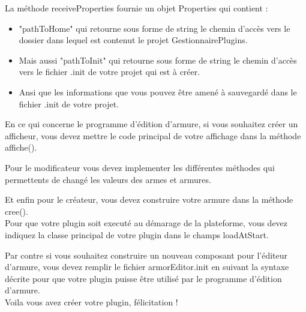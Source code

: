 La méthode receiveProperties fournie un objet Properties qui contient : 
\begin{itemize}
    \item "pathToHome" qui retourne sous forme de string le chemin d'accès vers le dossier dans lequel est contenut le projet GestionnairePlugins.
    \item Mais aussi "pathToInit" qui retourne sous forme de string le chemin d'accès vers le fichier .init de votre projet qui est à créer.
    \item Ansi que les informations que vous pouvez être amené à sauvegardé dans le fichier .init de votre projet.\\
\end{itemize}

En ce qui concerne le programme d'édition d'armure, si vous souhaitez créer un afficheur, vous devez mettre le code principal de votre affichage dans la méthode affiche().

Pour le modificateur vous devez implementer les différentes méthodes qui permettents de changé les valeurs des armes et armures.

Et enfin pour le créateur, vous devez construire votre armure dans la méthode cree().\\

Pour que votre plugin soit executé au démarage de la plateforme, vous devez indiquez la classe principal de votre plugin dans le champs loadAtStart.

Par contre si vous souhaitez construire un nouveau composant pour l'éditeur d'armure, vous devez remplir le fichier armorEditor.init en suivant la syntaxe décrite pour que votre plugin puisse être utilisé par le programme d'édition d'armure.\\

Voila vous avez créer votre plugin, félicitation !
